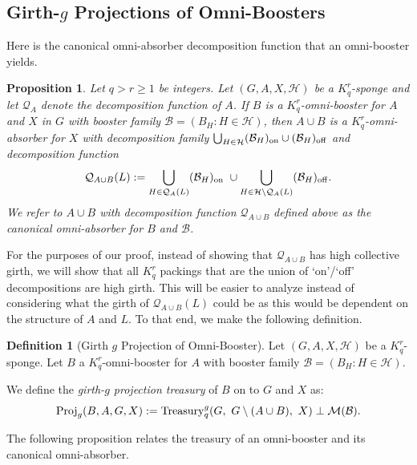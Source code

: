 \documentclass[11pt]{article}
\newcommand{\mc}[1]{\mathcal{#1}}
\newcounter{i}
\theoremstyle{plain}
\newtheorem{proposition}[thm]{Proposition}
\theoremstyle{plain} %
\theoremstyle{definition}
\newtheorem{definition}[thm]{Definition}
\begin{document}
\subsection{Girth-$g$ Projections of Omni-Boosters}

Here is the canonical omni-absorber decomposition function that an omni-booster yields.

\begin{proposition}\label{prop:CanonicalBoost}
Let $q > r\ge 1$ be integers. Let $(G,A,X,\mc{H})$ be a $K_q^r$-sponge and let $\mc{Q}_A$ denote the decomposition function of $A$. If $B$ is a $K_q^r$-omni-booster for $A$ and $X$ in $G$ with booster family $\mathcal{B}=(B_H: H\in\mathcal{H})$, then $A\cup B$ is a $K_q^r$-omni-absorber for $X$ with decomposition family $\bigcup_{H\in \mathcal{H}} (\mathcal{B}_H)_{{\rm on}}\cup (\mathcal{B}_H)_{{\rm off}}$ and decomposition function
$$\mathcal{Q}_{A\cup B}(L):= \bigcup_{H\in \mathcal{Q}_A(L)} (\mathcal{B}_H)_{{\rm on}}~\cup \bigcup_{H \in \mathcal{H}\setminus \mathcal{Q}_A(L)} (\mathcal{B}_H)_{{\rm off}}.$$    
We refer to $A\cup B$ with decomposition function $\mathcal{Q}_{A\cup B}$ defined above as the \emph{canonical omni-absorber} for $B$ and $\mathcal{B}$.
\end{proposition}

For the purposes of our proof, instead of showing that $\mathcal{Q}_{A\cup B}$ has high collective girth, we will show that all $K_q^r$ packings that are the union of `on'/`off' decompositions are high girth. This will be easier to analyze instead of considering what the girth of $\mathcal{Q}_{A\cup B}(L)$ could be as this would be dependent on the structure of $A$ and $L$. 
To that end, we make the following definition.

\begin{definition}[Girth $g$ Projection of Omni-Booster]\label{def:OmniBoosterProj}
Let $(G,A,X,\mc{H})$ be a $K_q^r$-sponge. Let $B$ a $K_q^r$-omni-booster for $A$ with booster family $\mathcal{B}=(B_H:H\in\mathcal{H})$. 

We define the \emph{girth-$g$ projection treasury} of $B$ on to $G$ and $X$ as:
$${\rm Proj}_g(B,A,G,X):= {\rm Treasury}_q^g(G,~G\setminus (A\cup B),~X) \perp \mathcal{M}(\mc{B}).$$
\end{definition}

The following proposition relates the treasury of an omni-booster and its canonical omni-absorber.
\end{document}
